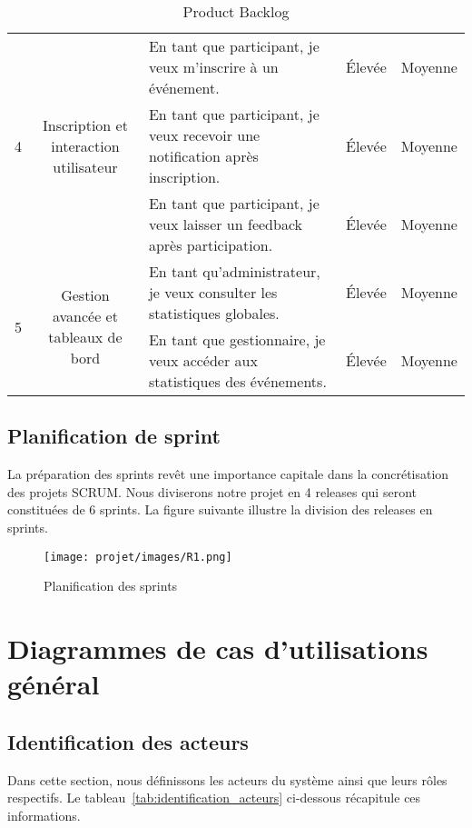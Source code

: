 \begin{table}[h!]
\renewcommand{\arraystretch}{1.6}
\setlength{\tabcolsep}{5pt}
\centering
\begin{tabular}{|c|c|m{7cm}|c|c|}
\hline
\multirow{3}{*}{4} & \multirow{3}{*}{\parbox{3cm}{\centering Inscription et interaction utilisateur}} 
& En tant que participant, je veux m’inscrire à un événement. & Élevée & Moyenne \\
\cline{3-5}
& & En tant que participant, je veux recevoir une notification après inscription. & Élevée & Moyenne \\
\cline{3-5}
& & En tant que participant, je veux laisser un feedback après participation. & Élevée & Moyenne \\
\hline
\multirow{3}{*}{5} & \multirow{3}{*}{\parbox{3cm}{\centering Gestion avancée et tableaux de bord}} 
& En tant qu’administrateur, je veux consulter les statistiques globales. & Élevée & Moyenne \\
\cline{3-5}
& & En tant que gestionnaire, je veux accéder aux statistiques des événements. & Élevée & Moyenne \\
\cline{3-5}
\hline
\end{tabular}
\caption{Product Backlog}
\end{table}

\clearpage
\subsection{Planification de sprint}
La préparation des sprints revêt une importance capitale dans la concrétisation des projets
SCRUM. Nous diviserons notre projet en 4 releases qui seront constituées de 6 sprints. La figure
suivante illustre la division des releases en sprints.
\begin{figure}[H]
    \centering
    \texttt{[image: projet/images/R1.png]}
    \caption{Planification des sprints}
    \label{fig:equipe_scrum}
 \end{figure}

\section{Diagrammes de cas d'utilisations général}

\subsection{Identification des acteurs}

Dans cette section, nous définissons les acteurs du système ainsi que leurs rôles respectifs. Le tableau~\ref{tab:identification_acteurs} ci-dessous récapitule ces informations.

